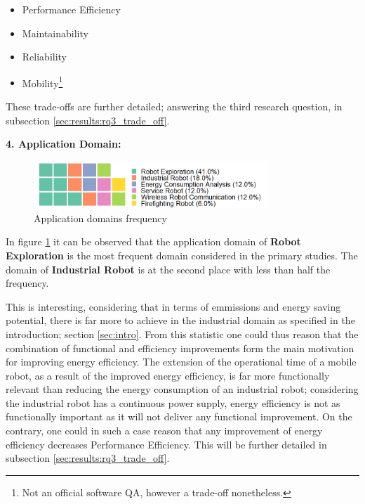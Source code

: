 \begin{itemize}
    \item Performance Efficiency
    \item Maintainability
    \item Reliability
    \item Mobility\footnote{Not an official software QA, however a trade-off nonetheless.}
\end{itemize}

These trade-offs are further detailed; answering the third research question, in subsection \ref{sec:results:rq3_trade_off}.

\vspace{5mm}

\noindent\textbf{4. Application Domain:}
\begin{figure}[t]
    \includegraphics[width=250pt]{figures/waffle_appdomain_freq.png}
    \caption{Application domains frequency}
    \label{fig:app_domains}
\end{figure}
In figure \ref{fig:app_domains} it can be observed that the application domain of \textbf{Robot Exploration} is the most frequent
domain considered in the primary studies. 
The domain of \textbf{Industrial Robot} is at the second place with less than half the frequency.

This is interesting, considering that in terms of emmissions and energy saving potential, there is far more to achieve in the industrial domain
as specified in the introduction; section \ref{sec:intro}.
From this statistic one could thus reason that the combination of functional and efficiency improvements form the main motivation for improving energy efficiency. 
The extension of the operational time of a mobile robot, as a result of the improved energy efficiency, 
is far more functionally relevant than reducing the energy consumption of an industrial robot;
considering the industrial robot has a continuous power supply, energy efficiency is not as functionally important as it will
not deliver any functional improvement.
On the contrary, one could in such a case reason that any improvement of energy efficiency decreases Performance Efficiency.
This will be further detailed in subsection \ref{sec:results:rq3_trade_off}.

\vspace{5mm}

